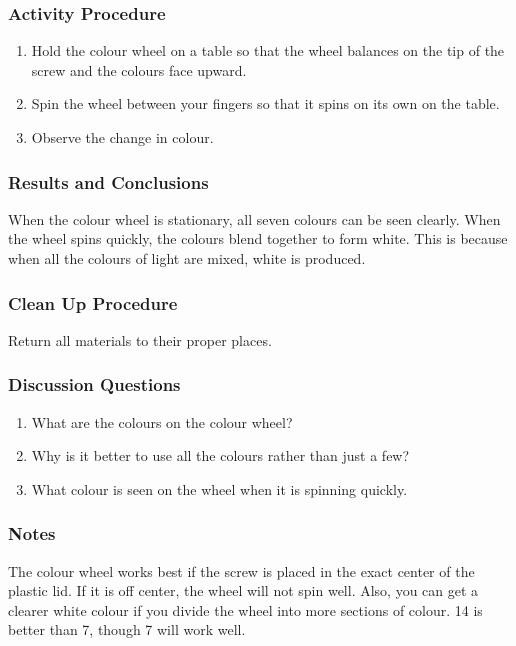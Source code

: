 \subsubsection*{Activity Procedure}
\begin{enumerate}
\item{Hold the colour wheel on a table so that the wheel balances on the tip of the screw and the colours face upward.} 
\item{Spin the wheel between your fingers so that it spins on its own on the table.} 
\item{Observe the change in colour.} 
\end{enumerate}

\subsubsection*{Results and Conclusions}
When the colour wheel is stationary, all seven colours can be seen clearly. When the wheel spins quickly, the colours blend together to form white. This is because when all the colours of light are mixed, white is produced.  

\subsubsection*{Clean Up Procedure}
Return all materials to their proper places.

\subsubsection*{Discussion Questions}
\begin{enumerate}
\item{What are the colours on the colour wheel?}
\item{Why is it better to use all the colours rather than just a few?}
\item{What colour is seen on the wheel when it is spinning quickly.} 
\end{enumerate}

\subsubsection*{Notes}
The colour wheel works best if the screw is placed in the exact center of the plastic lid. If it is off center, the wheel will not spin well. Also, you can get a clearer white colour if you divide the wheel into more sections of colour. 14 is better than 7, though 7 will work well.  


